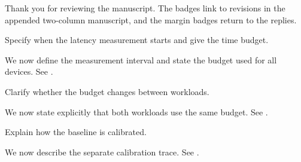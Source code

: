 \documentclass{ar2rc}
\begin{document}
\responseletterheader

Thank you for reviewing the manuscript. The badges link to revisions in the
appended two-column manuscript, and the margin badges return to the replies.

\begin{reviewerblock}
\begin{reviewercomment}
Specify when the latency measurement starts and give the time budget.
\end{reviewercomment}
\begin{reviewerresponse}
We now define the measurement interval and state the budget used for all
devices. See .
\end{reviewerresponse}
\end{reviewerblock}

\begin{reviewerblock}
\begin{reviewercomment}
Clarify whether the budget changes between workloads.
\end{reviewercomment}
\begin{reviewerresponse}
We now state explicitly that both workloads use the same budget. See
.
\end{reviewerresponse}
\end{reviewerblock}

\begin{reviewerblock}
\begin{reviewercomment}
Explain how the baseline is calibrated.
\end{reviewercomment}
\begin{reviewerresponse}
We now describe the separate calibration trace. See .
\end{reviewerresponse}
\end{reviewerblock}

\appendmainpaper
\end{document}
